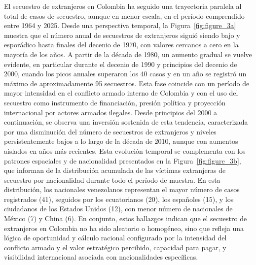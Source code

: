 \documentclass[12pt]{article}
\theoremstyle{definition}
\theoremstyle{remark}
\newcommand{\1}{\mathbf{1}}
\begin{document}
El secuestro de extranjeros en Colombia ha seguido una trayectoria paralela al total de casos de secuestro, aunque en menor escala, en el período comprendido entre 1964 y 2025. Desde una perspectiva temporal, la Figura~\ref{fig:figure_3a} muestra que el número anual de secuestros de extranjeros siguió siendo bajo y esporádico hasta finales del decenio de 1970, con valores cercanos a cero en la mayoría de los años. A partir de la década de 1980, un aumento gradual se vuelve evidente, en particular durante el decenio de 1990 y principios del decenio de 2000, cuando los picos anuales superaron los 40 casos y en un año se registró un máximo de aproximadamente 95 secuestros. Esta fase coincide con un período de mayor intensidad en el conflicto armado interno de Colombia y con el uso del secuestro como instrumento de financiación, presión política y proyección internacional por actores armados ilegales. Desde principios del 2000 a continuación, se observa una inversión sostenida de esta tendencia, caracterizada por una disminución del número de secuestros de extranjeros y niveles persistentemente bajos a lo largo de la década de 2010, aunque con aumentos aislados en años más recientes. Esta evolución temporal se complementa con los patrones espaciales y de nacionalidad presentados en la Figura~\ref{fig:figure_3b}, que informan de la distribución acumulada de las víctimas extranjeras de secuestro por nacionalidad durante todo el período de muestra. En esta distribución, los nacionales venezolanos representan el mayor número de casos registrados (41), seguidos por los ecuatorianos (20), los españoles (15), y los ciudadanos de los Estados Unidos (12), con menor número de nacionales de México (7) y China (6). En conjunto, estos hallazgos indican que el secuestro de extranjeros en Colombia no ha sido aleatorio o homogéneo, sino que refleja una lógica de oportunidad y cálculo racional configurado por la intensidad del conflicto armado y el valor estratégico percibido, capacidad para pagar, y visibilidad internacional asociada con nacionalidades específicas.
\end{document}
